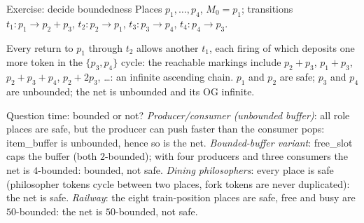 \begin{examplebox}{Exercise: decide boundedness}
Places $p_1, \ldots, p_4$, $M_0 = p_1$; transitions $t_1 : p_1 \to p_2 + p_3$, $t_2 : p_2 \to p_1$, $t_3 : p_3 \to p_4$, $t_4 : p_4 \to p_3$.
\begin{center}
\end{center}
Every return to $p_1$ through $t_2$ allows another $t_1$, each firing of which deposits one more token in the $\{p_3, p_4\}$ cycle: the reachable markings include $p_2 + p_3$, $p_1 + p_3$, $p_2 + p_3 + p_4$, $p_2 + 2p_3$, \dots: an infinite ascending chain. $p_1$ and $p_2$ are safe; $p_3$ and $p_4$ are unbounded; the net is unbounded and its OG infinite.
\end{examplebox}

\begin{examplebox}{Question time: bounded or not?}
\emph{Producer/consumer (unbounded buffer)}: all role places are safe, but the producer can push faster than the consumer pops: \textsf{item\_buffer} is unbounded, hence so is the net. \emph{Bounded-buffer variant}: \textsf{free\_slot} caps the buffer (both $2$-bounded); with four producers and three consumers the net is $4$-bounded: bounded, not safe. \emph{Dining philosophers}: every place is safe (philosopher tokens cycle between two places, fork tokens are never duplicated): the net is safe. \emph{Railway}: the eight train-position places are safe, \textsf{free} and \textsf{busy} are $50$-bounded: the net is $50$-bounded, not safe.
\end{examplebox}

